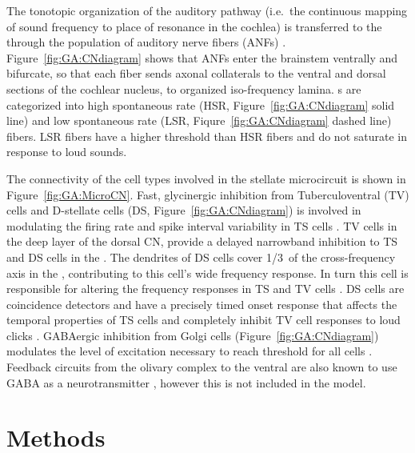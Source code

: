 \smallskip{} 

The tonotopic organization of the auditory pathway (i.e.\ the
continuous mapping of sound frequency to place of resonance in the
cochlea) is transferred to the {\CN} through the population of auditory
nerve fibers (ANFs)
\citep{Lorente:1981}. Figure~\ref{fig:GA:CNdiagram} shows that ANFs
enter the brainstem ventrally and bifurcate, so that each fiber sends
axonal collaterals to the ventral and dorsal sections of the cochlear
nucleus, to organized iso-frequency lamina. {\ANF}s are categorized into
high spontaneous rate (HSR, Figure~\ref{fig:GA:CNdiagram} solid line)
and low spontaneous rate (LSR, Fiqure~\ref{fig:GA:CNdiagram} dashed
line) fibers. LSR fibers have a higher threshold than HSR fibers and
do not saturate in response to loud sounds.

\smallskip{} 

The connectivity of the cell types involved in the stellate
microcircuit is shown in Figure~\ref{fig:GA:MicroCN}. Fast,
glycinergic inhibition from Tuberculoventral (TV) cells and D-stellate
cells (DS, Figure~\ref{fig:GA:CNdiagram}) is involved in modulating
the firing rate and spike interval variability in TS cells
\citep{FerragamoGoldingEtAl:1998,WickesbergOertel:1993}. TV cells in
the deep layer of the dorsal CN, provide a delayed narrowband
inhibition to TS and DS cells in the \VCN\@.  The dendrites of
DS cells cover 1/3~of the cross-frequency axis in the \CN, contributing
to this cell's wide frequency response. In turn this cell is
responsible for altering the frequency responses in TS and TV cells
\citep{SpirouDavisEtAl:1999}. DS cells are coincidence detectors and
have a precisely timed onset response that affects the temporal
properties of TS cells
\citep{PaoliniClareyEtAl:2005,RhodeGreenberg:1994a} and completely
inhibit TV cell responses to loud clicks
\citep{SpirouDavisEtAl:1999}. GABAergic inhibition from Golgi cells
(Figure~\ref{fig:GA:CNdiagram}) modulates the level of excitation
necessary to reach threshold for all {\CN} cells
\citep{CasparyBackoffEtAl:1994,FerragamoGoldingEtAl:1998}. Feedback
circuits from the olivary complex to the ventral {\CN} are also known to
use {GABA} as a neurotransmitter \citep{SaintMorestEtAl:1989}, however
this is not included in the model.

\smallskip{} 

\section{Methods}

